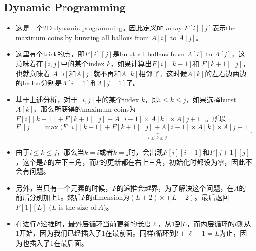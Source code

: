 \subsection{Dynamic Programming}
\begin{itemize}
\item 这是一个2D dynamic programming。因此定义\texttt{DP} array $F[i][j]$表示the maximum coins by bursting all ballons from $ A[i] $ to $ A[j] $。
\item 这里有个trick的点，即$F[i][j]$是burst all ballons from $ A[i] $ to $ A[j] $，这意味着在$ [i,j] $中的某个index $ k $，如果计算出$ F[i][k-1] $和 $ F[k+1][j] $，也就意味着 $ A[i] $和$ A[j] $就不再和$ A[k] $相邻了。这时候$ A[k] $的左右边两边的ballon分别是$ A[i-1] $和$ A[j+1] $了。
\item 基于上述分析，对于$ [i,j] $中的某个index $ k $，即$ i\leq k\leq j $，如果选择burst $A[k]$，那么所获得的maximum coins为$F[i][k-1] + F[k+1][j] + A[i-1]\times A[k]\times A[j+1]$。所以$ F][j] = \max(\underbrace{F[i][k-1] + F[k+1][j] + A[i-1]\times A[k]\times A[j+1]}_{i\leq k\leq j}$
\item 由于$i\leq k\leq j$，那么当$k=i$或者$k=j$时，会出现$ F[i][i-1] $和$ F[j+1][j] $，这个是$F$的左下三角，而$ F $的更新都在右上三角，初始化时都设为零，因此不会有问题。
\item 另外，当只有一个元素的时候，$ F $的递推会越界，为了解决这个问题，在$ A $的前后分别加上1。然后$F$的dimension为$ (L+2)\times(L+2) $。最后返回$F[1][L]$ ($ L $ is the size of $ A $)。
\item 在进行$ F $递推时，最外层循环当前更新的长度$ \ell $，从1到$ L $，而内层循环的$l$则从1开始，因为我们已经插入了1在最前面。同样$ l $循环到$l+\ell-1 = L$为止，因为也插入了1在最后面。
\end{itemize}
\setcounter{lstlisting}{0}
